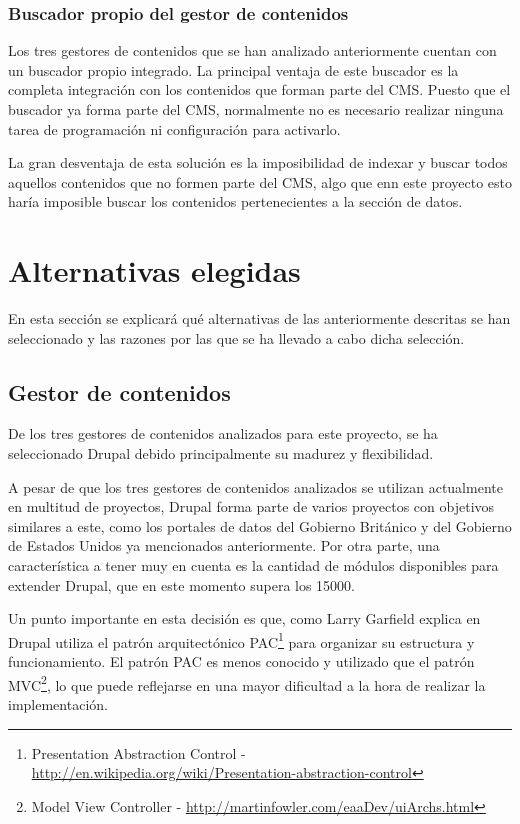 \subsubsection{Buscador propio del gestor de contenidos}
Los tres gestores de contenidos que se han analizado anteriormente cuentan con un buscador propio integrado.  La principal ventaja de este buscador es la completa integración con los contenidos que forman parte del CMS.  Puesto que el buscador ya forma parte del CMS, normalmente no es necesario realizar ninguna tarea de programación ni configuración para activarlo.

La gran desventaja de esta solución es la imposibilidad de indexar y buscar todos aquellos contenidos que no formen parte del CMS,  algo que enn este proyecto esto haría imposible buscar los contenidos pertenecientes a la sección de datos.



\section{Alternativas elegidas}
\label{chapter02:alternativas_seleccionadas}
En esta sección se explicará qué alternativas de las anteriormente descritas se han seleccionado y las razones por las que se ha llevado a cabo dicha selección.

\subsection{Gestor de contenidos}
De los tres gestores de contenidos analizados para este proyecto, se ha seleccionado Drupal debido principalmente su madurez y flexibilidad.

A pesar de que los tres gestores de contenidos analizados se utilizan actualmente en multitud de proyectos, Drupal forma parte de varios proyectos con objetivos similares a este, como los portales de datos del Gobierno Británico y del Gobierno de Estados Unidos ya mencionados anteriormente. Por otra parte, una característica a tener muy en cuenta es la cantidad de módulos disponibles para extender Drupal, que en este momento supera los 15000.

Un punto importante en esta decisión es que, como Larry Garfield explica en \cite[]{pac-vs-mvc} Drupal utiliza el patrón arquitectónico PAC\footnote{Presentation Abstraction Control - \url{http://en.wikipedia.org/wiki/Presentation-abstraction-control}} para organizar su estructura y funcionamiento.  El patrón PAC es menos conocido y utilizado que el patrón MVC\footnote{Model View Controller - \url{http://martinfowler.com/eaaDev/uiArchs.html}}, lo que puede reflejarse en una mayor dificultad a la hora de realizar la implementación.


